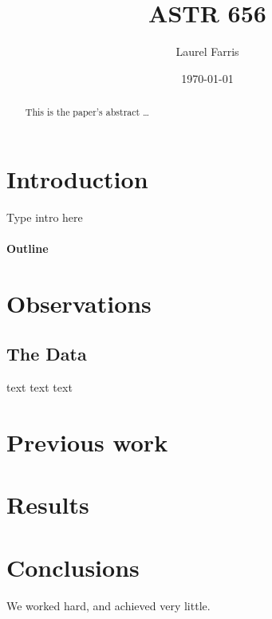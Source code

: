 \documentclass[12pt]{article}
\title{ASTR 656}
\author{Laurel Farris}
\date{\today}
\begin{document}

\maketitle

\begin{abstract}
This is the paper's abstract \ldots
\end{abstract}


\section{Introduction}
Type intro here
\paragraph{Outline}  %
\section{Observations}
  \subsection{The Data}
  text text text
\section{Previous work}\label{previous work}
\section{Results}\label{results}
\section{Conclusions}\label{conclusions}
We worked hard, and achieved very little.
\end{document}

